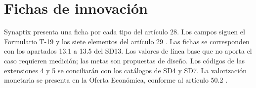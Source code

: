 \documentclass[11pt,letterpaper]{report}
\begin{document}
\renewcommand{\thetable}{T-19.\arabic{table}}
\tableofcontents
\clearpage
\chapter*{Fichas de innovación}

Synaptix presenta una ficha por cada tipo del artículo 28. Los campos siguen el Formulario T-19 y los siete elementos del artículo 29 \parencite[pp.~19--20 y 64]{bases-admin}. Las fichas se corresponden con los apartados 13.1 a 13.5 del SD13. Los valores de línea base que no aporta el caso requieren medición; las metas son propuestas de diseño. Los códigos de las extensiones 4 y 5 se conciliarán con los catálogos de SD4 y SD7. La valorización monetaria se presenta en la Oferta Económica, conforme al artículo 50.2 \parencite[p.~30]{bases-admin}.
\end{document}
